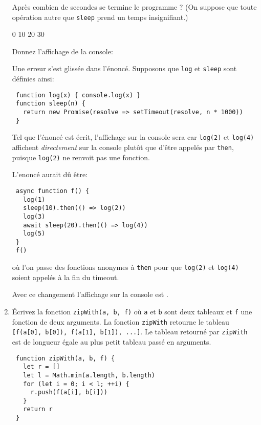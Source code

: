 \documentclass[a4paper, 12pt]{article}
\newcommand{\choice}[1]{\Square\hspace{2pt} #1\hspace{5pt}}
\newcommand{\fullpoint}[1]{\textcolor{RubineRed}{#1}}
\newcommand{\choiceg}[1]{\fullpoint{\XBox\hspace{2pt} #1\hspace{5pt}}}
\begin{document}
\begin{enumerate}
  Après combien de secondes se termine le programme ?  (On suppose que toute
  opération autre que \lstinline{sleep} prend un temps insignifiant.)

  \choice{0} \choice{10} \choiceg{20} \choice{30}

  Donnez l'affichage de la console:

  {\color{RubineRed} Une erreur s'est glissée dans l'énoncé.  Supposons que
    \lstinline{log} et \lstinline{sleep} sont définies ainsi:
    \begin{lstlisting}
 function log(x) { console.log(x) }
 function sleep(n) {
   return new Promise(resolve => setTimeout(resolve, n * 1000))
 }
    \end{lstlisting}

    Tel que l'énoncé est écrit, l'affichage sur la console sera
     car
    \lstinline{log(2)} et \lstinline{log(4)} affichent \emph{directement} sur la
    console plutôt que d'être appelés par \lstinline{then}, puisque
    \lstinline{log(2)} ne renvoit pas une fonction.

    L'enoncé aurait dû être:
    \begin{lstlisting}
 async function f() {
   log(1)
   sleep(10).then(() => log(2))
   log(3)
   await sleep(20).then(() => log(4))
   log(5)
 }
 f()
    \end{lstlisting}
    où l'on passe des fonctions anonymes à \lstinline{then} pour que
    \lstinline{log(2)} et \lstinline{log(4)} soient appelés à la fin du timeout.

    Avec ce changement l'affichage sur la console est .
  }

\item Écrivez la fonction \lstinline{zipWith(a, b, f)} où \lstinline{a} et
  \lstinline{b} sont deux tableaux et \lstinline{f} une fonction de deux
  arguments.  La fonction \lstinline{zipWith} retourne le tableau
  \lstinline{[f(a[0], b[0]), f(a[1], b[1]), ...]}.  Le tableau retourné par
  \lstinline{zipWith} est de longueur égale au plus petit tableau passé en
  arguments.
  \begin{lstlisting}
 function zipWith(a, b, f) {
   let r = []
   let l = Math.min(a.length, b.length)
   for (let i = 0; i < l; ++i) {
     r.push(f(a[i], b[i]))
   }
   return r
 }\end{lstlisting}
\end{enumerate}
\end{document}
